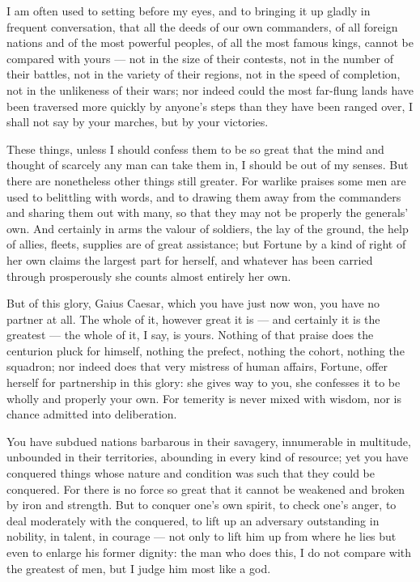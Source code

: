  I am often used to setting before my eyes, and to bringing it up gladly in frequent conversation, that all the deeds of our own commanders, of all foreign nations and of the most powerful peoples, of all the most famous kings, cannot be compared with yours --- not in the size of their contests, not in the number of their battles, not in the variety of their regions, not in the speed of completion, not in the unlikeness of their wars; nor indeed could the most far-flung lands have been traversed more quickly by anyone's steps than they have been ranged over, I shall not say by your marches, but by your victories.

 These things, unless I should confess them to be so great that the mind and thought of scarcely any man can take them in, I should be out of my senses. But there are nonetheless other things still greater. For warlike praises some men are used to belittling with words, and to drawing them away from the commanders and sharing them out with many, so that they may not be properly the generals' own. And certainly in arms the valour of soldiers, the lay of the ground, the help of allies, fleets, supplies are of great assistance; but Fortune by a kind of right of her own claims the largest part for herself, and whatever has been carried through prosperously she counts almost entirely her own.

 But of this glory, Gaius Caesar, which you have just now won, you have no partner at all. The whole of it, however great it is --- and certainly it is the greatest --- the whole of it, I say, is yours. Nothing of that praise does the centurion pluck for himself, nothing the prefect, nothing the cohort, nothing the squadron; nor indeed does that very mistress of human affairs, Fortune, offer herself for partnership in this glory: she gives way to you, she confesses it to be wholly and properly your own. For temerity is never mixed with wisdom, nor is chance admitted into deliberation.

 You have subdued nations barbarous in their savagery, innumerable in multitude, unbounded in their territories, abounding in every kind of resource; yet you have conquered things whose nature and condition was such that they could be conquered. For there is no force so great that it cannot be weakened and broken by iron and strength. But to conquer one's own spirit, to check one's anger, to deal moderately with the conquered, to lift up an adversary outstanding in nobility, in talent, in courage --- not only to lift him up from where he lies but even to enlarge his former dignity: the man who does this, I do not compare with the greatest of men, but I judge him most like a god.

